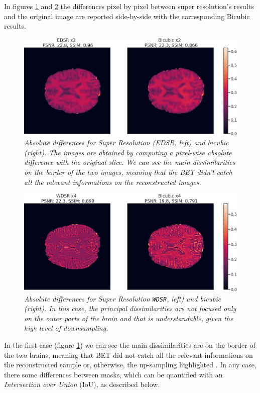 \documentclass[12pt,a4paper]{report}
\begin{document}
In figures \ref{fig:edsr-bet-diff} and \ref{fig:wdsr-bet-diff} the differences pixel by pixel between super resolution's results and the original image are reported side-by-side with the corresponding Bicubic results.

\begin{figure}[H]
\centering
 \includegraphics[scale=0.4]{./images/edsr_diff_betted}
 \caption{\it Absolute differences for Super Resolution (EDSR, left) and bicubic (right). The images are obtained by computing a pixel-wise absolute difference with the original slice. We can see the main dissimilarities on the border of the two images, meaning that the BET didn't catch all the relevant informations on the reconstructed images.}
 \label{fig:edsr-bet-diff}
\end{figure}

\begin{figure}[H]
\centering
 \includegraphics[scale=0.4]{./images/wdsr_diff_betted}
 \caption{\it Absolute differences for Super Resolution {\tt WDSR}, left) and bicubic (right). In this case, the principal dissimilarities are not focused only on the outer parts of the brain and that is understandable, given the high level of downsampling.}
 \label{fig:wdsr-bet-diff}
\end{figure}

In the first case (figure \ref{fig:edsr-bet-diff}) we can see the main dissimilarities are on the border of the two brains, meaning that BET did not catch all the relevant informations on the reconstructed sample or, otherwise, the up-sampling highlighted . 
In any case, there some differences between masks, which can be quantified with an {\it Intersection over Union} (IoU), as described below.  
\end{document}
